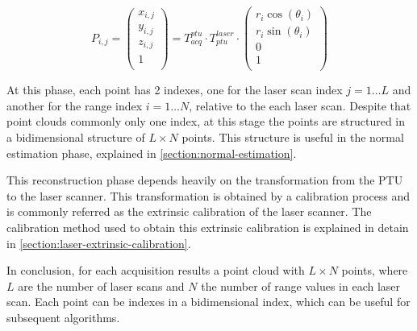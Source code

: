 \begin{equation}\label{eqn:point-registration}
    P_{i,j} = 
    \left(
        \begin{array}{c}
            x_{i,j} \\ y_{i,j} \\ z_{i,j} \\ 1 \\
        \end{array}    
    \right)
    =
    T_{acq}^{ptu}
    \cdot T_{ptu}^{laser}
    \cdot
    \left(
        \begin{array}{c}
            r_i \cos(\theta_i) \\
            r_i \sin(\theta_i) \\
            0 \\
            1 \\
        \end{array}    
    \right)
\end{equation}

At this phase, each point has 2 indexes, one for the laser scan index $j=1\dots L$ and another for the range index $i=1\dots N$, relative to the each laser scan. Despite that point clouds commonly only one index, at this stage the points are structured in a bidimensional structure of $L \times N$ points. This structure is useful in the normal estimation phase, explained in \cref{section:normal-estimation}.

This reconstruction phase depends heavily on the transformation from the PTU to the laser scanner. This transformation is obtained by a calibration process and is commonly referred as the extrinsic calibration of the laser scanner. The calibration method used to obtain this extrinsic calibration is explained in detain in \cref{section:laser-extrinsic-calibration}.

In conclusion, for each acquisition results a point cloud with $L \times N$ points, where $L$ are the number of laser scans and $N$ the number of range values in each laser scan. Each point can be indexes in a bidimensional index, which can be useful for subsequent algorithms.
